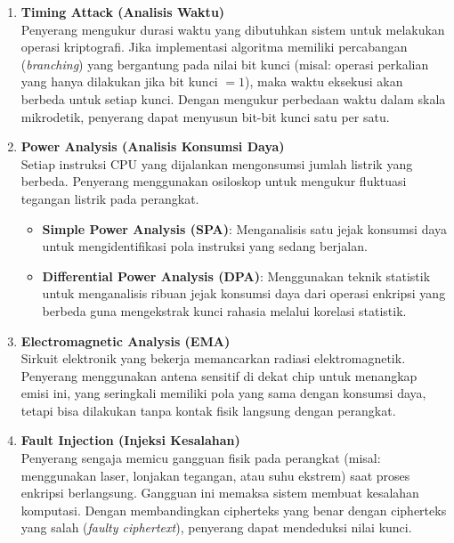 \begin{enumerate}
    \item \textbf{Timing Attack (Analisis Waktu)} \\
    Penyerang mengukur durasi waktu yang dibutuhkan sistem untuk melakukan operasi kriptografi. Jika implementasi algoritma memiliki percabangan (\textit{branching}) yang bergantung pada nilai bit kunci (misal: operasi perkalian yang hanya dilakukan jika bit kunci $= 1$), maka waktu eksekusi akan berbeda untuk setiap kunci. Dengan mengukur perbedaan waktu dalam skala mikrodetik, penyerang dapat menyusun bit-bit kunci satu per satu.

    \item \textbf{Power Analysis (Analisis Konsumsi Daya)} \\
    Setiap instruksi CPU yang dijalankan mengonsumsi jumlah listrik yang berbeda. Penyerang menggunakan osiloskop untuk mengukur fluktuasi tegangan listrik pada perangkat.
    \begin{itemize}
        \item \textbf{Simple Power Analysis (SPA)}: Menganalisis satu jejak konsumsi daya untuk mengidentifikasi pola instruksi yang sedang berjalan.
        \item \textbf{Differential Power Analysis (DPA)}: Menggunakan teknik statistik untuk menganalisis ribuan jejak konsumsi daya dari operasi enkripsi yang berbeda guna mengekstrak kunci rahasia melalui korelasi statistik.
    \end{itemize}

    \item \textbf{Electromagnetic Analysis (EMA)} \\
    Sirkuit elektronik yang bekerja memancarkan radiasi elektromagnetik. Penyerang menggunakan antena sensitif di dekat chip untuk menangkap emisi ini, yang seringkali memiliki pola yang sama dengan konsumsi daya, tetapi bisa dilakukan tanpa kontak fisik langsung dengan perangkat.

    \item \textbf{Fault Injection (Injeksi Kesalahan)} \\
    Penyerang sengaja memicu gangguan fisik pada perangkat (misal: menggunakan laser, lonjakan tegangan, atau suhu ekstrem) saat proses enkripsi berlangsung. Gangguan ini memaksa sistem membuat kesalahan komputasi. Dengan membandingkan cipherteks yang benar dengan cipherteks yang salah (\textit{faulty ciphertext}), penyerang dapat mendeduksi nilai kunci.
\end{enumerate}

